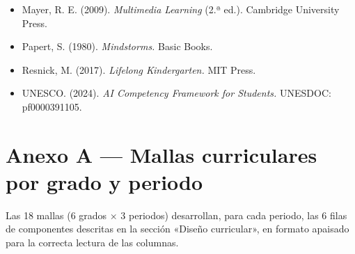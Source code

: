 \documentclass[12pt, a4paper]{article}
\begin{document}
\begin{itemize}
  \item Mayer, R. E. (2009). \textit{Multimedia Learning} (2.ª ed.).
    Cambridge University Press.
  \item Papert, S. (1980). \textit{Mindstorms.} Basic Books.
  \item Resnick, M. (2017). \textit{Lifelong Kindergarten.} MIT Press.
  \item UNESCO. (2024). \textit{AI Competency Framework for Students.}
    UNESDOC: pf0000391105.
\end{itemize}


\clearpage
\appendix
\section{Anexo A — Mallas curriculares por grado y periodo}

\noindent Las 18 mallas (6 grados $\times$ 3 periodos) desarrollan, para
cada periodo, las 6 filas de componentes descritas en la sección «Diseño
curricular», en formato apaisado para la correcta lectura de las columnas.
\end{document}

